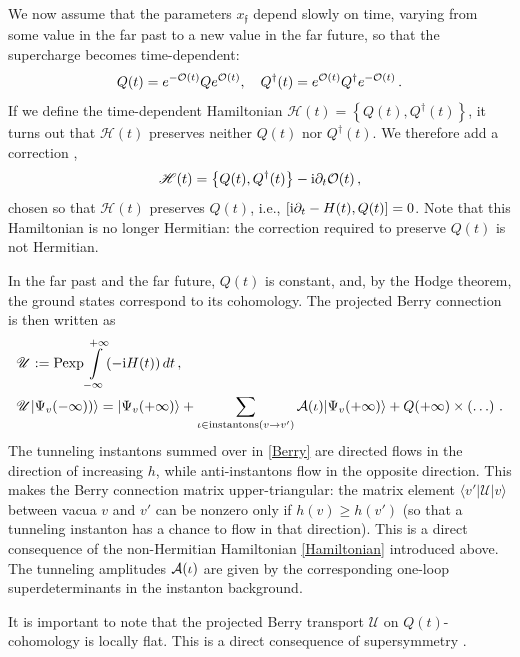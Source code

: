 \documentclass[10pt]{article}
\theoremstyle{definition}
\def\I{{\rm i}}
\def\p{\partial}
\def\CA{{\cal A}}
\def\CO {{\cal O}}
\def\CO {{\cal O}}
\def\ff{\mathfrak{f}}
\def\sH{{\mathscr{H}}}
\def\sU{{\mathscr{U}}}
\def\lm{\limits}
\numberwithin{equation}{section}
\begin{document}
We now assume that the parameters $x_{\ff}$ depend slowly on time, varying from some value in the far past to a new value in the far future, so that the supercharge becomes time-dependent:
\begin{equation}
	Q(t)=e^{-\CO(t)}Qe^{\CO(t)},\quad Q^{\dagger}(t)=e^{\CO(t)}Q^{\dagger}e^{-\CO(t)}\,.
\end{equation}
If we define the time-dependent Hamiltonian $\sH(t)=\left\{Q(t),Q^{\dagger}(t)\right\}$, it turns out that $\sH(t)$ preserves neither $Q(t)$ nor $Q^{\dagger}(t)$.
We therefore add a correction \cite{Galakhov:2025fhd},
\begin{equation}\label{Hamiltonian}
	\sH(t)=\left\{Q(t),Q^{\dagger}(t)\right\}-\I\p_t\CO(t)\,,
\end{equation}
chosen so that $\sH(t)$ preserves $Q(t)$, i.e., $\left[\I\p_t-H(t),Q(t)\right]=0$.
Note that this Hamiltonian is no longer Hermitian: the correction required to preserve $Q(t)$ is not Hermitian.

In the far past and the far future, $Q(t)$ is constant, and, by the Hodge theorem, the ground states correspond to its cohomology.
The projected Berry connection is then written as
\begin{equation}\label{Berry}
	\begin{aligned}
		& \sU:={\rm Pexp}\int\lm_{-\infty}^{+\infty} (-\I H(t))\,dt\,,\\
		& \sU|\Psi_v(-\infty))\rangle=|\Psi_v(+\infty)\rangle+\sum\lm_{\iota\in{\rm instantons}(v\to v')}\CA(\iota)|\Psi_v(+\infty)\rangle+Q(+\infty)\times \left(\ldots\right)\,.
	\end{aligned}
\end{equation}
The tunneling instantons summed over in \eqref{Berry} are directed flows in the direction of increasing $h$, while anti-instantons flow in the opposite direction.
This makes the Berry connection matrix upper-triangular: the matrix element $\langle v'|\sU|v\rangle$ between vacua $v$ and $v'$ can be nonzero only if $h(v) \geq h(v')$ (so that a tunneling instanton has a chance to flow in that direction).
This is a direct consequence of the non-Hermitian Hamiltonian \eqref{Hamiltonian} introduced above.
The tunneling amplitudes $\CA(\iota)$ are given by the corresponding one-loop superdeterminants in the instanton background.

It is important to note that the projected Berry transport $\sU$ on $Q(t)$-cohomology is locally flat.
This is a direct consequence of supersymmetry \cite[Sec.~3.1.2]{Galakhov:2025fhd}.
\end{document}
